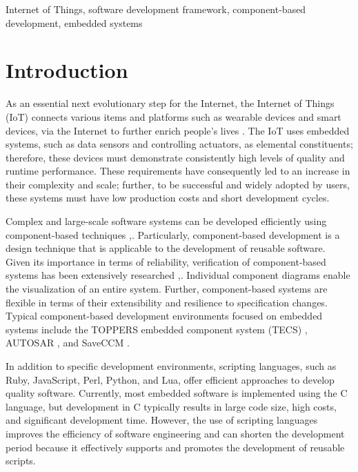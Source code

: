 \documentclass[JIP]{ipsj_v2/UTF8/ipsj}
\begin{document}
\begin{keyword}
Internet of Things, software development framework, component-based development, embedded systems
\end{keyword}

\maketitle

\section{Introduction}
\label{sec:Introduction}

As an essential next evolutionary step for the Internet, the Internet of Things (IoT) connects various items and platforms such as wearable devices and smart devices, via the Internet to further enrich people's lives \cite{par:IoTComputing}.
The IoT uses embedded systems, such as data sensors and controlling actuators, as elemental constituents; therefore, these devices must demonstrate consistently high levels of quality and runtime performance.
These requirements have consequently led to an increase in their complexity and scale; further, to be successful and widely adopted by users, these systems must have low production costs and short development cycles.

Complex and large-scale software systems can be developed efficiently using component-based techniques \cite{par:Crnkovic},\cite{par:CBD}.
Particularly, component-based development is a design technique that is applicable to the development of reusable software.
Given its importance in terms of reliability, verification of component-based systems has been extensively researched \cite{par:Blaming},\cite{par:Verification}.
Individual component diagrams enable the visualization of an entire system.
Further, component-based systems are flexible in terms of their extensibility and resilience to specification changes.
Typical component-based development environments focused on embedded systems include the TOPPERS embedded component system (TECS) \cite{par:TECS}, AUTOSAR \cite{url:AUTOSAR}, and SaveCCM \cite{par:SAVEapproach}.

In addition to specific development environments, scripting languages, such as Ruby, JavaScript, Perl, Python, and Lua, offer efficient approaches to develop quality software.
Currently, most embedded software is implemented using the C language, but development in C typically results in large code size, high costs, and significant development time.
However, the use of scripting languages improves the efficiency of software engineering and can shorten the development period because it effectively supports and promotes the development of reusable scripts.
\end{document}
